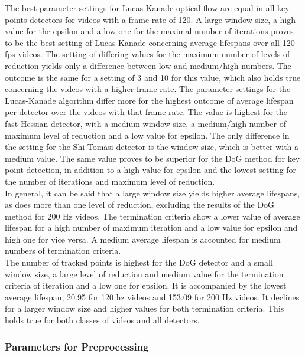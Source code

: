 \documentclass[Bachelorarbeit.tex]{subfiles}
\begin{document}
The best parameter settings for Lucas-Kanade optical flow are equal in all key points detectors for videos with a frame-rate of 120. A large window size, a high value for the epsilon and a low one for the maximal number of iterations proves to be the best setting of Lucas-Kanade concerning average lifespans over all 120 fps videos. The setting of differing values for the maximum number of levels of reduction yields only a difference between low and medium/high numbers. The outcome is the same for a setting of 3 and 10 for this value, which also holds true concerning the videos with a higher frame-rate. The parameter-settings for the Lucas-Kanade algorithm differ more for the highest outcome of average lifespan per detector over the videos with that frame-rate. The value is highest for the fast Hessian detector, with a medium window size, a medium/high number of maximum level of reduction and a low value for epsilon. The only difference in the setting for the Shi-Tomasi detector is the window size, which is better with a medium value. The same value proves to be superior for the DoG method for key point detection, in addition to a high value for epsilon and the lowest setting for the number of iterations and maximum level of reduction.\\
In general, it can be said that a large window size yields higher average lifespans, as does more than one level of reduction, excluding the results of the DoG method for 200 Hz videos. The termination criteria show a lower value of average lifespan for a high number of maximum iteration and a low value for epsilon and high one for vice versa. A medium average lifespan is accounted for medium numbers of termination criteria. \\
The number of tracked points is highest for the DoG detector and a small window size, a large level of reduction and medium value for the termination criteria of iteration and a low one for epsilon. It is accompanied by the lowest average lifespan, 20.95 for 120 hz videos and 153.09 for 200 Hz videos. It declines for a larger window size and higher values for both termination criteria. This holds true for both classes of videos and all detectors.

\subsubsection{Parameters for Preprocessing}
\end{document}
